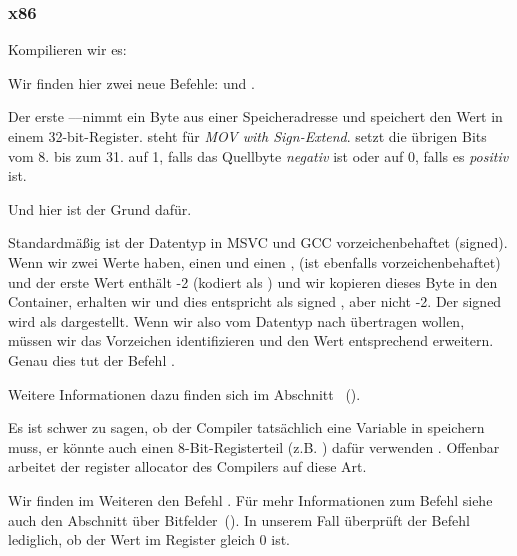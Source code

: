 \subsubsection{x86}


Kompilieren wir es:




Wir finden hier zwei neue Befehle: \MOVSX und \TEST.

\label{MOVSX}

Der erste --\MOVSX--nimmt ein Byte aus einer Speicheradresse und speichert den
Wert in einem 32-bit-Register.
\MOVSX steht für \emph{MOV with Sign-Extend}.
\MOVSX setzt die übrigen Bits vom 8. bis zum 31. auf 1, falls das Quellbyte
\emph{negativ} ist oder auf 0, falls es \emph{positiv} ist.

Und hier ist der Grund dafür.

Standardmäßig ist der \Tchar Datentyp in MSVC und GCC vorzeichenbehaftet
(signed). Wenn wir zwei Werte haben, einen \Tchar und einen \Tint, (\Tint ist
ebenfalls vorzeichenbehaftet) und der erste Wert enthält -2 (kodiert als
) und wir kopieren dieses Byte in den \Tint Container, erhalten wir
 und dies entspricht als signed , aber nicht -2. Der
signed  wird als  dargestellt. Wenn wir also 
vom Datentyp \Tchar nach \Tint übertragen wollen, müssen wir das Vorzeichen
identifizieren und den Wert entsprechend erweitern. Genau dies tut der Befehl
\MOVSX.

Weitere Informationen dazu finden sich im Abschnitt
\q{\emph{\SignedNumbersSectionName}} ~().

Es ist schwer zu sagen, ob der Compiler tatsächlich eine \Tchar Variable in \EDX
speichern muss, er könnte auch einen 8-Bit-Registerteil (z.B. \DL) dafür
verwenden . Offenbar arbeitet der \gls{register allocator} des Compilers auf
diese Art.


Wir finden im Weiteren den Befehl . 
Für mehr Informationen zum \TEST Befehl siehe auch den Abschnitt über
Bitfelder~().
In unserem Fall überprüft der Befehl lediglich, ob der Wert im Register \EDX
gleich 0 ist.

